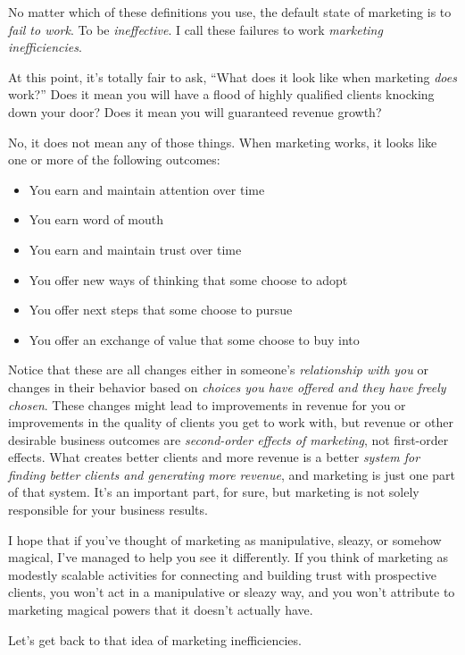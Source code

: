 No matter which of these definitions you use, the default state of marketing is to \emph{fail to work}. To be \emph{ineffective}. I call these failures to work \emph{marketing inefficiencies}.

At this point, it's totally fair to ask, ``What does it look like when marketing \emph{does} work?'' Does it mean you will have a flood of highly qualified clients knocking down your door? Does it mean you will guaranteed revenue growth?

No, it does not mean any of those things. When marketing works, it looks like one  or more of the following outcomes:

\begin{itemize}
\item You earn and maintain attention over time
\item You earn word of mouth
\item You earn and maintain trust over time
\item You offer new ways of thinking that some choose to adopt
\item You offer next steps that some choose to pursue
\item You offer an exchange of value that some choose to buy into
\end{itemize}

Notice that these are all changes either in someone's \emph{relationship with you} or changes in their behavior based on \emph{choices you have offered and they have freely chosen}. These changes might lead to improvements in revenue for you or improvements in the quality of clients you get to work with, but revenue or other desirable business outcomes are \emph{second-order effects of marketing}, not first-order effects. What creates better clients and more revenue is a better \emph{system for finding better clients and generating more revenue}, and marketing is just one part of that system. It's an important part, for sure, but marketing is not solely responsible for your business results.

I hope that if you've thought of marketing as manipulative, sleazy, or somehow magical, I've managed to help you see it differently. If you think of marketing as modestly scalable activities for connecting and building trust with prospective clients, you won't act in a manipulative or sleazy way, and you won't attribute to marketing magical powers that it doesn't actually have.

Let's get back to that idea of marketing inefficiencies.

